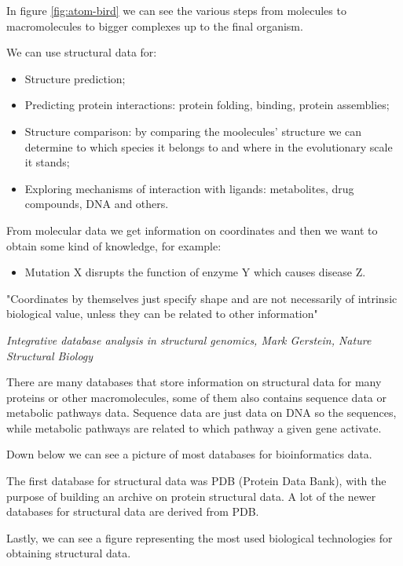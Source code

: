 In figure \ref{fig:atom-bird} we can see the various steps from molecules to macromolecules to bigger complexes up to the final organism.

We can use structural data for:
\begin{itemize}
    \item Structure prediction;
    \item Predicting protein interactions: protein folding, binding, protein assemblies;
    \item Structure comparison: by comparing the moolecules' structure we can determine to which species it belongs to and where in the evolutionary scale it stands;
    \item Exploring mechanisms of interaction with ligands: metabolites, drug compounds, DNA and others.
\end{itemize}

From molecular data we get information on coordinates and then we want to obtain some kind of knowledge, for example:
\begin{itemize}
    \item Mutation X disrupts the function of enzyme Y which causes disease Z.
\end{itemize}

\vspace{1em}

\noindent "Coordinates by themselves just specify shape and are not necessarily of intrinsic biological value, unless they can be related to other information"

\noindent \small{\textit{Integrative database analysis in structural genomics, Mark Gerstein, Nature Structural Biology}}

\pagebreak

\normalsize{There are many databases that store information on structural data for many proteins or other macromolecules, some of them also contains sequence data or metabolic pathways data. Sequence data are just data on DNA so the sequences, while metabolic pathways are related to which pathway a given gene activate.}

Down below we can see a picture of most databases for bioinformatics data.

The first database for structural data was PDB (Protein Data Bank), with the purpose of building an archive on protein structural data. A lot of the newer databases for structural data are derived from PDB.

Lastly, we can see a figure representing the most used biological technologies for obtaining structural data.

